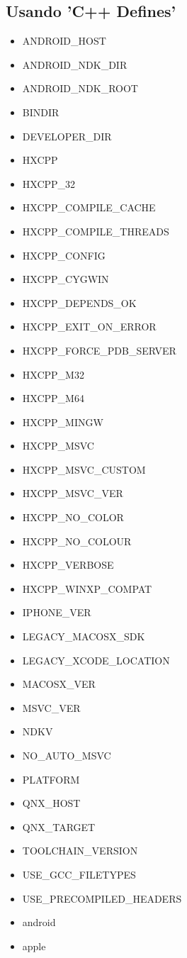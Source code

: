 \subsection{Usando 'C++ Defines'}
\label{target-cpp-defines}
\begin{itemize}
	\item ANDROID_HOST
	\item ANDROID_NDK_DIR
	\item ANDROID_NDK_ROOT
	\item BINDIR
	\item DEVELOPER_DIR
	\item HXCPP
	\item HXCPP_32
	\item HXCPP_COMPILE_CACHE
	\item HXCPP_COMPILE_THREADS
	\item HXCPP_CONFIG
	\item HXCPP_CYGWIN
	\item HXCPP_DEPENDS_OK
	\item HXCPP_EXIT_ON_ERROR
	\item HXCPP_FORCE_PDB_SERVER
	\item HXCPP_M32
	\item HXCPP_M64
	\item HXCPP_MINGW
	\item HXCPP_MSVC
	\item HXCPP_MSVC_CUSTOM
	\item HXCPP_MSVC_VER
	\item HXCPP_NO_COLOR
	\item HXCPP_NO_COLOUR
	\item HXCPP_VERBOSE
	\item HXCPP_WINXP_COMPAT
	\item IPHONE_VER
	\item LEGACY_MACOSX_SDK
	\item LEGACY_XCODE_LOCATION
	\item MACOSX_VER
	\item MSVC_VER
	\item NDKV
	\item NO_AUTO_MSVC
	\item PLATFORM
	\item QNX_HOST
	\item QNX_TARGET
	\item TOOLCHAIN_VERSION
	\item USE_GCC_FILETYPES
	\item USE_PRECOMPILED_HEADERS
	\item android
	\item apple

\end{itemize}
